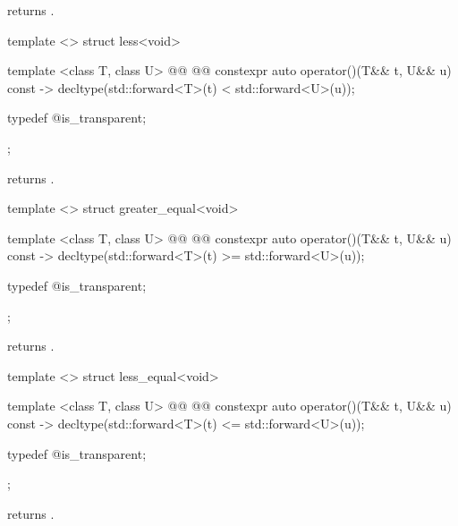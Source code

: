 \begin{itemdescr}
\pnum
{} returns .
\end{itemdescr}

%
\begin{itemdecl}
template <> struct less<void> {
  template <class T, class U>
    @@
      @@
  constexpr auto operator()(T&& t, U&& u) const
    -> decltype(std::forward<T>(t) < std::forward<U>(u));

  typedef @\unspec@ is_transparent;
};
\end{itemdecl}

\begin{itemdescr}
\pnum
{} returns .
\end{itemdescr}

%
\begin{itemdecl}
template <> struct greater_equal<void> {
  template <class T, class U>
    @@
      @@
  constexpr auto operator()(T&& t, U&& u) const
    -> decltype(std::forward<T>(t) >= std::forward<U>(u));

  typedef @\unspec@ is_transparent;
};
\end{itemdecl}

\begin{itemdescr}
\pnum
{} returns .
\end{itemdescr}

%
\begin{itemdecl}
template <> struct less_equal<void> {
  template <class T, class U>
    @@
      @@
  constexpr auto operator()(T&& t, U&& u) const
    -> decltype(std::forward<T>(t) <= std::forward<U>(u));

  typedef @\unspec@ is_transparent;
};
\end{itemdecl}

\begin{itemdescr}
\pnum
{} returns .
\end{itemdescr}

